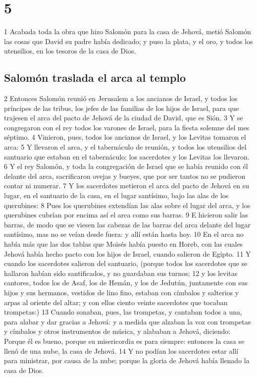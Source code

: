 \chapter{5}


1 Acabada toda la obra que hizo Salomón para la casa de Jehová, metió Salomón las cosas que David su padre había dedicado; y puso la plata, y el oro, y todos los utensilios, en los tesoros de la casa de Dios.
\section*{Salomón traslada el arca al templo}


2 Entonces Salomón reunió en Jerusalem a los ancianos de Israel, y todos los príncipes de las tribus, los jefes de las familias de los hijos de Israel, para que trajesen el arca del pacto de Jehová de la ciudad de David, que es Sión.
3 Y se congregaron con el rey todos los varones de Israel, para la fiesta solemne del mes séptimo.
4 Vinieron, pues, todos los ancianos de Israel, y los Levitas tomaron el arca:
5 Y llevaron el arca, y el tabernáculo de reunión, y todos los utensilios del santuario que estaban en el tabernáculo: los sacerdotes y los Levitas los llevaron.
6 Y el rey Salomón, y toda la congregación de Israel que se había  reunido con él delante del arca, sacrificaron ovejas y bueyes, que por ser tantos no se pudieron contar ni numerar.
7 Y los sacerdotes metieron el arca del pacto de Jehová en su lugar, en el santuario de la casa, en el lugar santísimo, bajo las alas de los querubines:
8 Pues los querubines extendían las alas sobre el lugar del arca, y los querubines cubrían por encima así el arca como sus barras.
9 E hicieron salir las barras, de modo que se viesen las cabezas de las barras del arca delante del lugar santísimo, mas no se veían desde fuera: y allí están hasta hoy.
10 En el arca no había más que las dos tablas que Moisés había puesto en Horeb, con las cuales Jehová había hecho pacto con los hijos de Israel, cuando salieron de Egipto.
11 Y cuando los sacerdotes salieron del santuario, (porque todos los sacerdotes que se hallaron habían sido santificados, y no guardaban sus turnos;
12 y los levitas cantores, todos los de Asaf, los de Hemán, y los de Jedutún, juntamente con sus hijos y sus hermanos, vestidos de lino fino, estaban con címbalos y salterios y arpas al oriente del altar; y con ellos ciento veinte sacerdotes que tocaban trompetas:)
13 Cuando sonaban, pues, las trompetas, y cantaban todos  a  una, para alabar y dar gracias  a  Jehová: y a medida que alzaban la voz con trompetas y címbalos y otros instrumentos de música, y alababan  a  Jehová, diciendo: Porque él es bueno, porque su misericordia es para siempre: entonces la casa se llenó de una nube, la casa de Jehová.
14 Y no podían los sacerdotes estar allí para ministrar, por causa de la nube; porque la gloria de Jehová había llenado la casa de Dios. 

